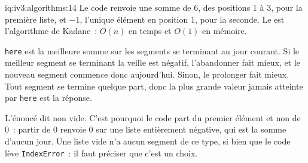 \begin{solution}{iq:iv3:algorithms:14}
Le code renvoie une somme de 6, des positions 1 à 3, pour la première liste, et $-1$, l'unique élément en position 1, pour la seconde. Le  est l'algorithme de Kadane~: $O(n)$ en temps et $O(1)$ en mémoire.
\label{lst:iv3:al:kadane}

\texttt{here} est la meilleure somme sur les segments se terminant au jour courant. Si le meilleur segment se terminant la veille est négatif, l'abandonner fait mieux, et le nouveau segment commence donc aujourd'hui. Sinon, le prolonger fait mieux. Tout segment se termine quelque part, donc la plus grande valeur jamais atteinte par \texttt{here} est la réponse.

L'énoncé dit non vide. C'est pourquoi le code part du premier élément et non de 0~: partir de 0 renvoie 0 sur une liste entièrement négative, qui est la somme d'aucun jour. Une liste vide n'a aucun segment de ce type, si bien que le code lève \texttt{IndexError}~: il faut préciser que c'est un choix.

\end{solution}

